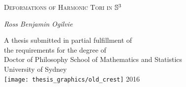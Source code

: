 
\cleardoublepage\thispagestyle{empty}
\begin{center}
{\huge{\scshape Deformations of Harmonic Tori in} $\S^3$\par}
\vspace{2cm}
{\Large\itshape Ross Benjamin Ogilvie \par}
\vfil\vfil\vfil
    A thesis submitted in partial fulfillment of\\
    the requirements for the degree of\\
    Doctor of Philosophy
\vfil\vfil
  {\large{School of Mathematics and Statistics}\\[5pt]
  University of Sydney}\\
  \vskip6mm
  \texttt{[image: thesis\_graphics/old\_crest]}
\vfil
  \normalsize 2016
\vfil
\end{center}
\cleardoublepage
